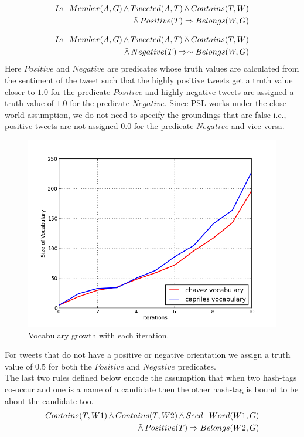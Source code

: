 \begin{align*}
\begin{split}
Is\_Member(A,G)
	 \softand Tweeted(A,T)
	\softand Contains(T,W)\\
	 \softand Positive(T) 
	\Rightarrow Belongs(W,G)
\end{split}
\end{align*}

\begin{align*}
\begin{split}
Is\_Member(A,G) 
	\softand Tweeted(A,T)
	\softand Contains(T,W)\\
	\softand Negative(T)
	\Rightarrow \sim Belongs(W,G)
\end{split}
\end{align*}
Here $Positive$ and $Negative$ are predicates whose truth values are calculated from the sentiment of the tweet such that the highly positive tweets get a truth value closer to $1.0$ for the predicate $Positive$ and highly negative tweets are assigned a truth value of $1.0$ for the predicate $Negative$. 
Since PSL works under the close world assumption, we do not need to specify the groundings that are false i.e., positive tweets are not assigned $0.0$ for the predicate $Negative$ and vice-versa.
\begin{figure}
	\centering
	\includegraphics[scale=0.50]{support_files/WordGrowth.png}
	\caption{Vocabulary growth with each iteration.}
	\label{fig:wordgrowth}
\end{figure}
For tweets that do not have a positive or negative orientation we assign a truth value of $0.5$ for both the $Positive$ and $Negative$ predicates.\\
The last two rules defined below encode the assumption that when two hash-tags co-occur and one is a name of a candidate then the other hash-tag is bound to be about the candidate too.
\begin{align*}
\begin{split}
Contains(T,W1)
 \softand Contains(T,W2)
  \softand Seed\_Word(W1,G)\\ 
  \softand Positive(T)
	\Rightarrow Belongs(W2,G)
\end{split}
\end{align*}

